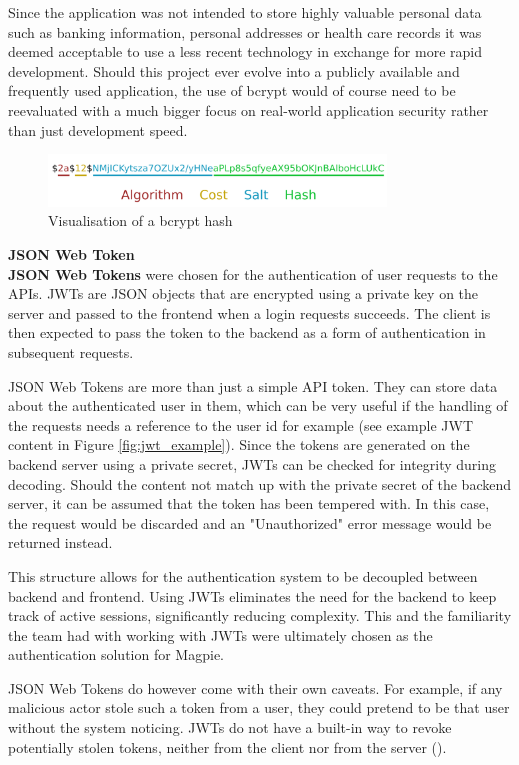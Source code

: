 Since the application was not intended to store highly valuable personal data
such as banking information, personal addresses or health care records it was
deemed acceptable to use a less recent technology in exchange for more rapid
development. Should this project ever evolve into a publicly available and
frequently used application, the use of bcrypt would of course need to be
reevaluated with a much bigger focus on real-world application security rather
than just development speed.

\begin{figure}[H]
  \centering{}
  \includegraphics[width=0.8\textwidth]{./images/bcrypt_hash.png}
  \caption{Visualisation of a bcrypt hash}
  \label{fig:bcrypt_hash}
\end{figure}

\label{jwt}\textbf{JSON Web Token}\\
\textbf{JSON Web Tokens} were chosen for the authentication of user requests to
the APIs. JWTs are JSON objects that are encrypted using a private key on the
server and passed to the frontend when a login requests succeeds. The client is
then expected to pass the token to the backend as a form of authentication in
subsequent requests.

JSON Web Tokens are more than just a simple API token. They can store data about
the authenticated user in them, which can be very useful if the handling of the
requests needs a reference to the user id for example (see example JWT content
in Figure \ref{fig:jwt_example}). Since the tokens are generated on the backend
server using a private secret, JWTs can be checked for integrity during
decoding. Should the content not match up with the private secret of the backend
server, it can be assumed that the token has been tempered with. In this case,
the request would be discarded and an "Unauthorized" error message would be
returned instead.

This structure allows for the authentication system to be decoupled between
backend and frontend. Using JWTs eliminates the need for the backend to keep
track of active sessions, significantly reducing complexity. This and the
familiarity the team had with working with JWTs were ultimately chosen as the
authentication solution for Magpie.

JSON Web Tokens do however come with their own caveats. For example, if any
malicious actor stole such a token from a user, they could pretend to be that
user without the system noticing. JWTs do not have a built-in way to revoke
potentially stolen tokens, neither from the client nor from the server
(\cite{owasp_jwt_cheatsheet}).


